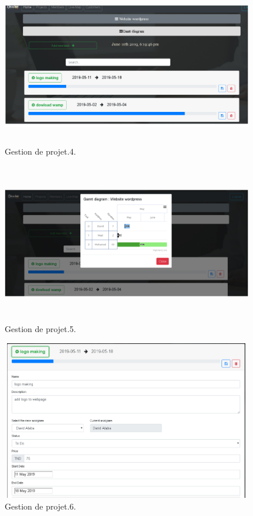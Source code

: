 \FloatBarrier
\begin{figure}[H]
\center
\includegraphics[width=11cm,height=7cm]{./figures/pres/gp4.png}
\caption{Gestion de projet.4.}
\end{figure}
\FloatBarrier



\FloatBarrier
\begin{figure}[H]
\center
\includegraphics[width=11cm,height=7cm]{./figures/pres/gp5.png}
\caption{Gestion de projet.5.}
\end{figure}
\FloatBarrier


\FloatBarrier
\begin{figure}[H]
\center
\includegraphics[width=11cm,height=7cm]{./figures/pres/gp6.png}
\caption{Gestion de projet.6.}
\end{figure}
\FloatBarrier 